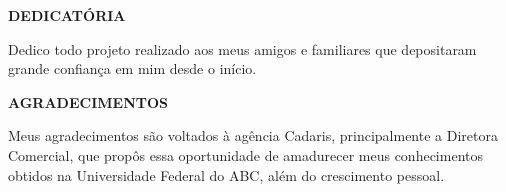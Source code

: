 \documentclass[
  12pt,				%
  openany,
  oneside,
  a4paper,			%
  english,			%
  brazil
]{article}
\numberwithin{figure}{section}
\numberwithin{table}{section}
\begin{document}

\begin{titlepage}

\begin{center}
\textbf{DEDICATÓRIA}
\end{center}

Dedico todo projeto realizado aos meus amigos e familiares que depositaram grande confiança em mim desde o início.


\end{titlepage}


\begin{titlepage}

\begin{center}
\textbf{AGRADECIMENTOS}
\end{center}

Meus agradecimentos são voltados à agência Cadaris, principalmente a Diretora Comercial, que propôs essa oportunidade de amadurecer meus conhecimentos obtidos na Universidade Federal do ABC, além do crescimento pessoal.


\end{titlepage}


%
%
%


%
%
%
%
%
%
\end{document}
